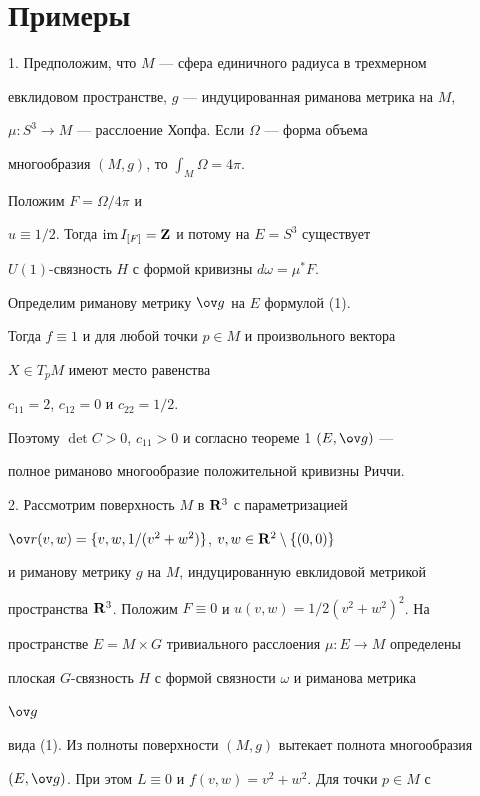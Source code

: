 \section*{Примеры}





1. Предположим, что  $M$ --- сфера единичного радиуса в трехмерном


евклидовом пространстве, $g$ --- индуцированная риманова метрика на $M$,


$\mu:S^3\to M$ --- расслоение Хопфа. Если $\Omega$ --- форма объема


многообразия $(M,g)$, то $\displaystyle\int_M\Omega=4\pi$.


Положим $F=\Omega/4\pi$ и


$u\equiv1/2$. Тогда $\operatorname{im} I_{[F]}={\bold Z}$ и потому на $E=S^3$ существует


$U(1)$-связность $H$ с формой кривизны $d\omega=\mu^*F$.


Определим риманову метрику $\g$ на $E$ формулой (1).


Тогда $f\equiv1$ и для любой точки $p\in M$ и произвольного вектора


$X\in T_pM$ имеют место равенства


$c_{11}=2$, $c_{12}=0$ и $c_{22}=1/2$.


Поэтому $\det C>0$, $c_{11}>0$ и согласно теореме 1 $(E,\g)$ ---


полное риманово многообразие положительной кривизны Риччи.


\smallskip





2. Рассмотрим поверхность $M$ в ${\bold R}^3$ с параметризацией


$\ov r(v,w)=\{v,w,1/(v^2+w^2)\}$, $v,w\in{\bold R}^2\setminus\{(0,0)\}$


и риманову метрику $g$ на $M$, индуцированную евклидовой метрикой


пространства ${\bold R}^3$. Положим $F\equiv0$ и $u(v,w)=1/2(v^2+w^2)^2$. На


пространстве $E=M\times G$ тривиального расслоения $\mu:E\to M$ определены


плоская $G$-связность $H$ с формой связности $\omega$ и риманова метрика


$\g$


вида (1). Из полноты поверхности $(M,g)$ вытекает полнота многообразия


$(E,\g)$. При этом $L\equiv0$ и $f(v,w)=v^2+w^2$. Для точки $p\in M$ с


